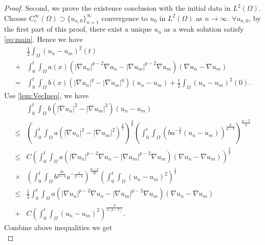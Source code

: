 \documentclass[11pt]{amsart}
\theoremstyle{definition}
\numberwithin{equation}{section}
\newcommand*\abs[1]{\lvert#1\rvert}
\newcommand*\Brace[1]{\lbrace#1\rbrace}
\begin{document}
\begin{proof}
	Second, we prove the existence conclusion with the initial data in $L^2(\Omega)$.
	Choose $C_c^{\infty}(\Omega) \supset \Brace{u_{n, 0}}_{n=1}^{\infty} $
	convergence to $u_0$ in $L^2(\Omega) $ as $n \to \infty $. $\forall u_{n, 0}$,
	by the first part of this proof, there exist a unique $u_n$ as a weak solution satisfy \cref{eq:main}.
	Hence we have
	\begin{equation}
		\begin{split}
			& \frac{1}{2}\int_{\Omega}\left(u_n-u_m\right)^2(t)\\
			+{} & \int_{0}^{t}\int_{\Omega}a(x)
			\left(\abs{\nabla u_n}^{p-2}\nabla u_n
			- \abs{\nabla u_m}^{p-2}\nabla u_m\right)
			\left(\nabla u_n - \nabla u_m\right)\\
			={} & \int_{0}^{t}\int_{\Omega}b(x)\left(\abs{\nabla u_n}^q
			- \abs{\nabla u_m}^q\right)\left(u_n - u_m\right)
			+ \frac{1}{2}\int_{\Omega}\left(u_n-u_m\right)^2(0).
		\end{split}
	\end{equation}
	Use \cref{lem:VecIneq}, we have
	\begin{equation}
		\begin{split}
			& \int_{0}^{t}\int_{\Omega}b\left(\abs{\nabla u_n}^2
			- \abs{\nabla u_m}^2\right)\left(u_n - u_m\right)\\
			\leq{} & \left(\int_0^t\int_{\Omega}a\left(\abs{\nabla u_n}^2
			- \abs{\nabla u_m}^2\right)^{\frac{p}{2}}\right)^{\frac{2}{p}}
			\left(\int_0^t\int_{\Omega}\left(ba^{-\frac{2}{p}}
			\left(u_n-u_m\right)\right)^{\frac{p}{p-2}}\right)^{\frac{p-2}{p}}\\
			\leq{} & C\left(\int_0^t\int_{\Omega}a
			\left(\abs{\nabla u_n}^{p-2}\nabla u_n
			- \abs{\nabla u_m}^{p-2}\nabla u_m\right)
			\left(\nabla u_n - \nabla u_m\right)\right)^{\frac{2}{p}}\\
			\times{} & \left(\int_0^t\int_{\Omega}b^{\frac{2p}{p-4}}a^{-\frac{4}{p-4}}\right)^{\frac{p-4}{2p}}
			\left(\int_0^t\int_{\Omega}\left(u_n-u_m\right)^2\right)^{\frac{1}{2}}\\
			\leq{} & \frac{1}{2}\int_0^t\int_{\Omega}a
			\left(\abs{\nabla u_n}^{p-2}\nabla u_n
			- \abs{\nabla u_m}^{p-2}\nabla u_m\right)
			\left(\nabla u_n - \nabla u_m\right)\\
			+{} & C\left(\int_0^t\int_{\Omega}\left(u_n-u_m\right)^2\right)^{\frac{p}{2(p-2)}}.
		\end{split}
	\end{equation}
	Combine above inequalities we get
	\begin{equation}\label{un-umL2_0TW1p_bd_0TL2_L20}

\end{equation}
\end{proof}
\end{document}
